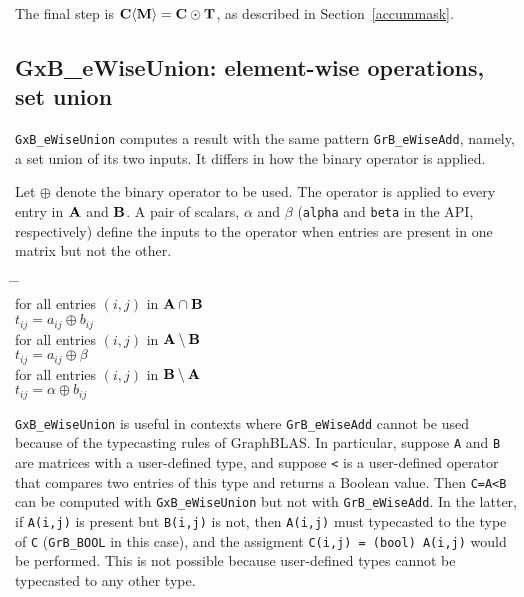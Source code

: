 \documentclass[12pt]{article}
\begin{document}
The final step is ${\bf C \langle M \rangle  = C \odot T}$, as described in
Section~\ref{accummask}.

\newpage
\subsection{{\sf GxB\_eWiseUnion:} element-wise operations, set union} %
\label{eWiseUnion}

\verb'GxB_eWiseUnion' computes a result with the same pattern
\verb'GrB_eWiseAdd', namely, a set union of its two inputs.  It differs in how
the binary operator is applied.

Let $\oplus$ denote the binary operator to be used.  The operator is applied to
every entry in $\bf A$ and $\bf B$.  A pair of scalars, $\alpha$ and $\beta$
(\verb'alpha' and \verb'beta' in the API, respectively) define the
inputs to the operator when entries are present in one matrix but not the
other.

    \vspace{-0.2in}
    {\small
    \begin{tabbing}
    \hspace{2em} \= \hspace{2em} \= \hspace{2em} \= \\
    \> for all entries $(i,j)$ in ${\bf A \cap B}$ \\
    \> \> $t_{ij} = a_{ij} \oplus b_{ij}$ \\
    \> for all entries $(i,j)$ in ${\bf A \setminus B}$ \\
    \> \> $t_{ij} = a_{ij} \oplus \beta $ \\
    \> for all entries $(i,j)$ in ${\bf B \setminus A}$ \\
    \> \> $t_{ij} = \alpha \oplus b_{ij}$
    \end{tabbing}
    }

\verb'GxB_eWiseUnion' is useful in contexts where \verb'GrB_eWiseAdd' cannot be
used because of the typecasting rules of GraphBLAS.  In particular, suppose
\verb'A' and \verb'B' are matrices with a user-defined type, and suppose
\verb'<' is a user-defined operator that compares two entries of this type and
returns a Boolean value.  Then \verb'C=A<B' can be computed with
\verb'GxB_eWiseUnion' but not with \verb'GrB_eWiseAdd'.  In the latter, if
\verb'A(i,j)' is present but \verb'B(i,j)' is not, then \verb'A(i,j)' must
typecasted to the type of \verb'C' (\verb'GrB_BOOL' in this case), and the
assigment \verb'C(i,j) = (bool) A(i,j)' would be performed.  This is not
possible because user-defined types cannot be typecasted to any other type.
\end{document}
